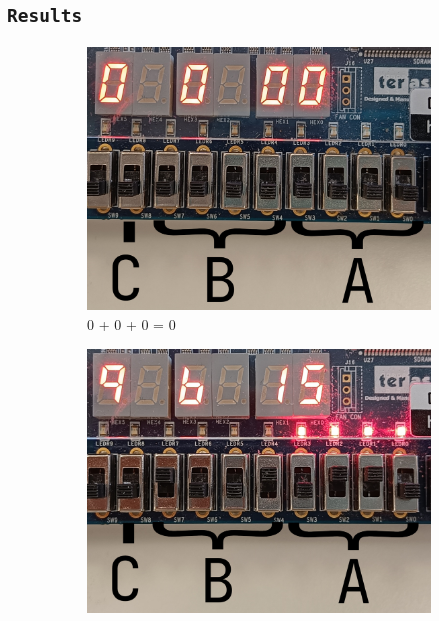 \documentclass{article}
\let\oldsubsection\subsection
\renewcommand{\subsection}[1]{%
  \oldsubsection{\texttt{#1}}%
  \setcounter{subsubsection}{-1}%
}
\begin{document}
\clearpage
\subsection{Results}
\begin{figure}[h]
    \centering
    \begin{subfigure}{0.4\textwidth}
        \centering
        \includegraphics[width=1\textwidth]{Figures/Part4-0_0_0.jpg}
        \caption{0 + 0 + 0 = 0}
        \label{fig:T04pic1}
    \end{subfigure}
    \hfill
    \begin{subfigure}{0.4\textwidth}
        \centering
        \includegraphics[width=1\textwidth]{Figures/Part4-0_9_6.jpg}

\end{subfigure}
\end{figure}
\end{document}
